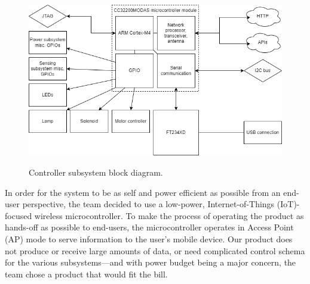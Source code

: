 \documentclass[journal]{IEEEtran}
\begin{document}
\begin{figure}[H]
   \centering
   \includegraphics[width=\linewidth]{images/control-block-diagram.png}
   \label{fig:control-block-diagram}
   \caption{Controller subsystem block diagram.}
\end{figure}

In order for the system to be as self and power efficient as possible from an end-user perspective, the 
team decided to use a low-power, Internet-of-Things (IoT)-focused wireless microcontroller. To make the 
process of operating the product as hands-off as possible to end-users, the microcontroller operates 
in Access Point (AP) mode to serve information to the user's mobile device. Our product does not produce 
or receive large amounts of data, or need complicated control schema for the various subsystems---and with 
power budget being a major concern, the team chose a product that would fit the bill.
\end{document}

